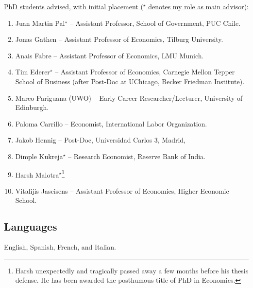 \documentclass[12pt,english]{article}
\newcommand\reverselabel[1]{%
  \def\theenumi{}%
  \renewcommand\makelabel{\makebox[\dimexpr\labelwidth-3pt\relax][r]{%
    \the\numexpr#1-\value{enumi}+1\relax}}}%
\begin{document}
\noindent \underline{PhD students advised, with initial placement ($^\star$ denotes my role as main advisor):} 
\begin{enumerate}\reverselabel{10}
\item Juan Martin Pal$^\star$ -- Assistant Professor, School of Government, PUC Chile.
\item Jonas Gathen -- Assistant Professor of Economics, Tilburg University.
\item Anais Fabre -- Assistant Professor of Economics, LMU Munich.
\item Tim Ederer$^\star$ -- Assistant Professor of Economics, Carnegie Mellon Tepper School of Business (after Post-Doc at UChicago, Becker Friedman Institute).
\item Marco Pariguana (UWO) -- Early Career Researcher/Lecturer, University of Edinburgh.
\item Paloma Carrillo -- Economist, International Labor Organization.
\item Jakob Hennig -- Post-Doc, Universidad Carlos 3, Madrid,
\item Dimple Kukreja$^\star$ --  Research Economist, Reserve Bank of India.
\item Harsh Malotra$^\star$\footnote{Harsh unexpectedly and tragically passed away a few months before his thesis defense. He has been awarded the posthumous title of PhD in Economics.} 
\item Vitalijis Jascisens -- Assistant Professor of Economics, Higher Economic School.
\end{enumerate}

\subsection*{Languages}
English, Spanish, French, and Italian.
\end{document}
